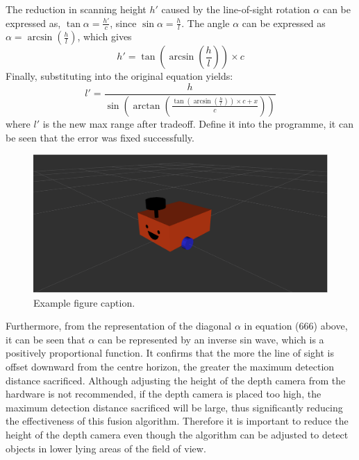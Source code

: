 The reduction in scanning height $h'$ caused by the line-of-sight rotation $\alpha$ can be expressed as, $\tan\alpha=\frac{h'}{c}
$, since $\sin\alpha=\frac{h}{l}$. The angle $\alpha$ can be expressed as $\alpha=\arcsin(\frac{h}{l})$, which gives
\begin{equation}
    h'=\tan(\arcsin(\frac{h}{l}))\times c
\end{equation}
Finally, substituting into the original equation yields: 
\begin{equation}
    l'=\frac{h}{\sin{(\arctan(\frac{\tan(\arcsin(\frac{h}{l}))\times c+x}{c}))}}
\end{equation}
where $l'$ is the new max range after tradeoff. Define it into the programme, it can be seen that the error was fixed successfully.
\begin{figure}[H]
    \centering
    \includegraphics[width=0.8\linewidth]{figs/robot.png}
    \caption{Example figure caption.}
\end{figure}
Furthermore, from the representation of the diagonal $\alpha$ in equation (666) above, it can be seen that $\alpha$ can be represented by an inverse sin wave, which is a positively proportional function. It confirms that the more the line of sight is offset downward from the centre horizon, the greater the maximum detection distance sacrificed. 
Although adjusting the height of the depth camera from the hardware is not recommended, if the depth camera is placed too high, the maximum detection distance sacrificed will be large, thus significantly reducing the effectiveness of this fusion algorithm. Therefore it is important to reduce the height of the depth camera even though the algorithm can be adjusted to detect objects in lower lying areas of the field of view.

